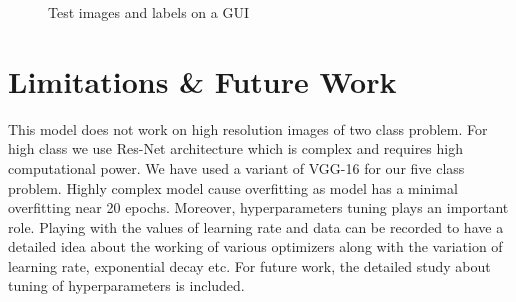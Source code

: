 \begin{figure}[htbp]
    \centering
    \begin{subfigure}[t]{0.3\textwidth}
        \caption{}
        \label{fig:4.7a}
    \end{subfigure}
    \begin{subfigure}[t]{0.3\textwidth}
        \caption{}
        \label{fig:4.7b}
    \end{subfigure}
    \begin{subfigure}[t]{0.3\textwidth}
      \caption{}
      \label{fig:4.7c}
  \end{subfigure}
    \captionsetup{justification = centering}
    \caption[]{Test images and labels on a GUI}
    \label{fig:4.7}
  \end{figure}

\section{Limitations \& Future Work}
This model does not work on high resolution images of two class problem.
For high class we use Res-Net architecture which is complex and
requires high computational power. We have used a variant of VGG-16 for
our five class problem. Highly complex model cause overfitting as model has
a minimal overfitting near 20 epochs. Moreover, hyperparameters tuning
plays an important role. Playing with the values of learning rate
and data can be recorded to have a detailed idea about the working
of various optimizers along with the variation of learning rate, exponential
decay etc. For future work, the detailed study about tuning of hyperparameters
is included.